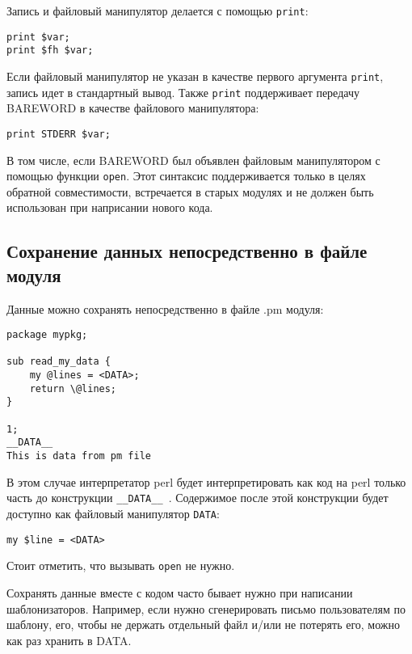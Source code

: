 Запись и файловый манипулятор делается с помощью \verb|print|:
\begin{verbatim}
print $var;
print $fh $var;
\end{verbatim}
Если файловый манипулятор не указан в качестве первого аргумента \verb|print|, запись идет в стандартный вывод. Также \verb|print| поддерживает передачу BAREWORD в качестве файлового манипулятора:
\begin{verbatim}
print STDERR $var;
\end{verbatim}
В том числе, если BAREWORD был объявлен файловым манипулятором с помощью функции \verb|open|. Этот синтаксис поддерживается только в целях обратной совместимости, встречается в старых модулях и не должен быть использован при наприсании нового кода.

\subsection{Сохранение данных непосредственно в файле модуля}
Данные можно сохранять непосредственно в файле .pm модуля:
\begin{verbatim}
package mypkg;

sub read_my_data {
    my @lines = <DATA>;
    return \@lines;
}

1;
__DATA__
This is data from pm file
\end{verbatim}
В этом случае интерпретатор perl будет интерпретировать как код на perl только часть до конструкции \verb|__DATA__ |. Содержимое после этой конструкции будет доступно как файловый манипулятор \verb|DATA|:
\begin{verbatim}
my $line = <DATA>
\end{verbatim}
Стоит отметить, что вызывать \verb|open| не нужно.

Сохранять данные вместе с кодом часто бывает нужно при написании шаблонизаторов. Например, если нужно сгенерировать письмо пользователям по шаблону, его, чтобы не держать отдельный файл и/или не потерять его, можно как раз хранить в DATA.


